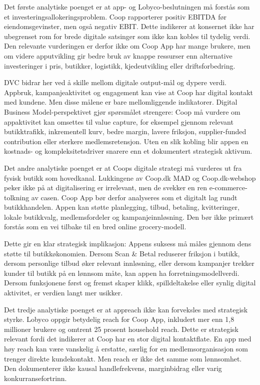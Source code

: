 \documentclass[12pt,a4paper]{article}
\begin{document}
Det første analytiske poenget er at app- og Lobyco-beslutningen må forstås som et investeringsallokeringsproblem. Coop rapporterer positiv EBITDA før eiendomsgevinster, men også negativ EBIT. Dette indikerer at konsernet ikke har ubegrenset rom for brede digitale satsinger som ikke kan kobles til tydelig verdi. Den relevante vurderingen er derfor ikke om Coop App har mange brukere, men om videre apputvikling gir bedre bruk av knappe ressurser enn alternative investeringer i pris, butikker, logistikk, kjedeutvikling eller driftsforbedring.

DVC bidrar her ved å skille mellom digitale output-mål og dypere verdi. Appbruk, kampanjeaktivitet og engagement kan vise at Coop har digital kontakt med kundene. Men disse målene er bare mellomliggende indikatorer. Digital Business Model-perspektivet gjør spørsmålet strengere: Coop må vurdere om appaktivitet kan omsettes til value capture, for eksempel gjennom relevant butikktrafikk, inkrementell kurv, bedre margin, lavere friksjon, supplier-funded contribution eller sterkere medlemsretensjon. Uten en slik kobling blir appen en kostnads- og kompleksitetsdriver snarere enn et dokumentert strategisk aktivum.

Det andre analytiske poenget er at Coops digitale strategi må vurderes ut fra fysisk butikk som hovedkanal. Lukkingene av Coop.dk MAD og Coop.dk-webshop peker ikke på at digitalisering er irrelevant, men de svekker en ren e-commerce-tolkning av casen. Coop App bør derfor analyseres som et digitalt lag rundt butikkhandelen. Appen kan støtte planlegging, tilbud, betaling, kvitteringer, lokale butikkvalg, medlemsfordeler og kampanjeinnløsning. Den bør ikke primært forstås som en vei tilbake til en bred online grocery-modell.

Dette gir en klar strategisk implikasjon: Appens suksess må måles gjennom dens støtte til butikkøkonomien. Dersom Scan \& Betal reduserer friksjon i butikk, dersom personlige tilbud øker relevant innløsning, eller dersom kampanjer trekker kunder til butikk på en lønnsom måte, kan appen ha forretningsmodellverdi. Dersom funksjonene først og fremst skaper klikk, spilldeltakelse eller synlig digital aktivitet, er verdien langt mer usikker.

Det tredje analytiske poenget er at appreach ikke kan forveksles med strategisk styrke. Lobyco oppgir betydelig reach for Coop App, inkludert mer enn 1,8 millioner brukere og omtrent 25 prosent household reach. Dette er strategisk relevant fordi det indikerer at Coop har en stor digital kontaktflate. En app med høy reach kan være vanskelig å erstatte, særlig for en medlemsorganisasjon som trenger direkte kundekontakt. Men reach er ikke det samme som lønnsomhet. Den dokumenterer ikke kausal handlefrekvens, marginbidrag eller varig konkurransefortrinn.
\end{document}
